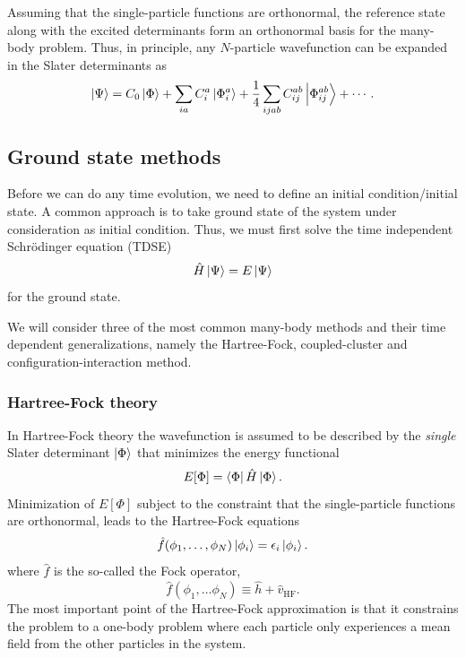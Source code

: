 \documentclass[aip,jcp,reprint,floatfix]{revtex4-1}
\begin{document}
    Assuming that the single-particle functions are orthonormal, the reference state along with the excited determinants form an orthonormal basis for the many-body problem. Thus, in principle, any $N$-particle wavefunction can be expanded in the Slater determinants as  
    \begin{equation}
        \ket{\Psi} = C_0 \ket{\Phi} + \sum_{ia} C^a_i \ket{\Phi^a_i} + \frac{1}{4} \sum_{ijab} C^{ab}_{ij} \ket{\Phi^{ab}_{ij}} + \cdots .
    \end{equation}
    
    \subsection{Ground state methods}
    Before we can do any time evolution, we need to define an initial condition/initial state. A common approach is to take ground state of the system under consideration as initial condition. Thus, we must first solve the time independent Schrödinger equation (TDSE)
    \begin{equation}
        \hat{H} \ket{\Psi} = E \ket{\Psi}
    \end{equation}
    for the ground state.
    
    We will consider three of the most common many-body methods and their time dependent generalizations, namely the Hartree-Fock, coupled-cluster and configuration-interaction method. 
    
    \subsubsection{Hartree-Fock theory}
    In Hartree-Fock theory the wavefunction is assumed to be described by the \emph{single} Slater determinant $\ket{\Phi}$ that minimizes the energy functional
    \begin{equation}
        E[\Phi] = \bra{\Phi}\hat{H}\ket{\Phi}.
    \end{equation}
    Minimization of $E[\Phi]$ subject to the constraint that the single-particle functions are orthonormal, leads to the Hartree-Fock equations 
    \begin{equation}
            \label{canonical_HF}
            \hat{f}(\phi_1, \dots , \phi_N)\ket{\phi_i} = \epsilon_i \ket{\phi_i}.
    \end{equation}
    where $\hat{f}$ is the so-called the Fock operator,
    \begin{equation}
            \hat{f}(\phi_1, \dots \phi_N) \equiv \hat{h} + \hat{v}_{\text{HF}}.
    \end{equation}
    The most important point of the Hartree-Fock approximation is that it constrains the problem to a one-body problem where each particle only experiences a mean field from the other particles in the system.
    
\end{document}
